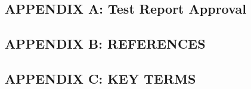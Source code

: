 \subsection*{APPENDIX A: Test Report Approval}



\subsection*{APPENDIX B: REFERENCES}



\subsection*{APPENDIX C: KEY TERMS}

